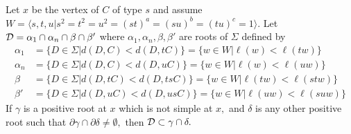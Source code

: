 \documentclass[class=book, crop=false,12 pt]{standalone}
\begin{document}
\begin{lemma}
	\label{lem:containD}
	Let $x$ be the vertex of $C$ of type $s$ and assume $W=\langle s,t,u|s^2=t^2=u^2=(st)^a=(su)^b=(tu)^c=1\rangle.$ Let $\mathcal{D}=\alpha_1\cap \alpha_n\cap \beta\cap \beta'$ where $\alpha_1,\alpha_n,\beta,\beta'$ are roots of $\Sigma$ defined by
\begin{align*}
	\alpha_1&=\{D\in \Sigma|d(D,C)<d(D,tC)\}=\{w\in W|\ell(w)<\ell(tw)\}\\
	\alpha_n&=\{D\in \Sigma|d(D,C)<d(D,uC)\}=\{w\in W|\ell(w)<\ell(uw)\}\\
	\beta&=\{D\in \Sigma|d(D,tC)<d(D,tsC)\}=\{w\in W|\ell(tw)<\ell(stw)\}\\
	\beta'&=\{D\in \Sigma|d(D,uC)<d(D,usC)\}=\{w\in W|\ell(uw)<\ell(suw)\}
\end{align*}
If $\gamma$ is a positive root at $x$ which is not simple at $x,$ and $\delta$ is any other positive root such that $\partial\gamma\cap \partial\delta\neq \emptyset,$ then $\mathcal{D}\subset \gamma\cap \delta.$
\end{lemma}
\end{document}
